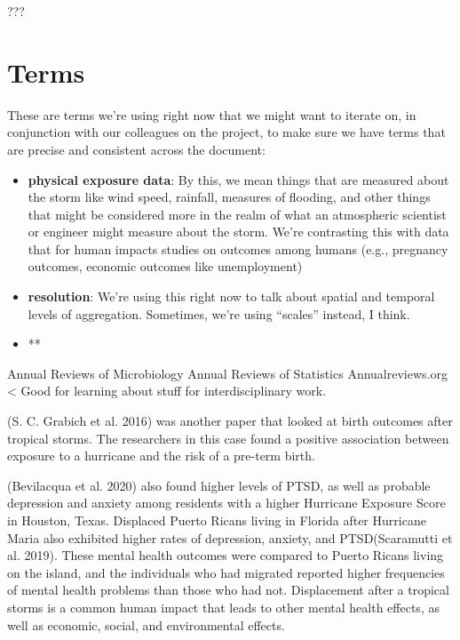 \documentclass[]{article}
\providecommand{\tightlist}{%
  \setlength{\itemsep}{0pt}\setlength{\parskip}{0pt}}
\begin{document}
???

\section{Terms}\label{terms}

These are terms we're using right now that we might want to iterate on,
in conjunction with our colleagues on the project, to make sure we have
terms that are precise and consistent across the document:

\begin{itemize}
\tightlist
\item
  \textbf{physical exposure data}: By this, we mean things that are
  measured about the storm like wind speed, rainfall, measures of
  flooding, and other things that might be considered more in the realm
  of what an atmospheric scientist or engineer might measure about the
  storm. We're contrasting this with data that for human impacts studies
  on outcomes among humans (e.g., pregnancy outcomes, economic outcomes
  like unemployment)
\item
  \textbf{resolution}: We're using this right now to talk about spatial
  and temporal levels of aggregation. Sometimes, we're using ``scales''
  instead, I think.
\item
  **
\end{itemize}

Annual Reviews of Microbiology Annual Reviews of Statistics
Annualreviews.org \textless{} Good for learning about stuff for
interdisciplinary work.

(S. C. Grabich et al. 2016) was another paper that looked at birth
outcomes after tropical storms. The researchers in this case found a
positive association between exposure to a hurricane and the risk of a
pre-term birth.

(Bevilacqua et al. 2020) also found higher levels of PTSD, as well as
probable depression and anxiety among residents with a higher Hurricane
Exposure Score in Houston, Texas. Displaced Puerto Ricans living in
Florida after Hurricane Maria also exhibited higher rates of depression,
anxiety, and PTSD(Scaramutti et al. 2019). These mental health outcomes
were compared to Puerto Ricans living on the island, and the individuals
who had migrated reported higher frequencies of mental health problems
than those who had not. Displacement after a tropical storms is a common
human impact that leads to other mental health effects, as well as
economic, social, and environmental effects.
\end{document}
